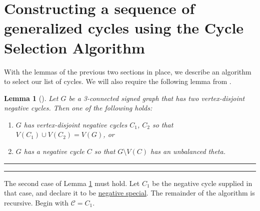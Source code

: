 \documentclass[12pt]{article}
\newtheorem{lemma}[theorem]{Lemma}
\begin{document}
\section{Constructing a sequence of generalized cycles using the Cycle Selection Algorithm}\label{csa}

With the lemmas of the previous two sections in place, we  describe an algorithm to select our list of cycles. We will also require the following lemma from \cite{devos2023nowherezero}.

\begin{lemma}[\cite{devos2023nowherezero}]\label{lem:firstCycle}
Let $G$ be a 3-connected signed graph that has two vertex-disjoint negative cycles.  Then one of the following holds:
\begin{enumerate}
\item $G$ has vertex-disjoint negative cycles $C_1$, $C_2$ so that $V(C_1) \cup V(C_2) =V(G)$, or
\item $G$ has a negative cycle $C$ so that $G \setminus V(C)$ has an unbalanced theta.
\end{enumerate}
\end{lemma}

\vspace{1cm}

\hrule

\smallskip

\hrule

\medskip

    
    \medskip
    
    

    \medskip


The second case of Lemma \ref{lem:firstCycle} must hold. Let $C_1$ be the negative cycle supplied in that case, and declare it to be \underline{negative special}. The remainder of the algorithm is recursive. Begin with $\mathcal{C} = C_1$.
\end{document}
